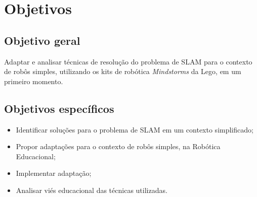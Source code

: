 	\section{Objetivos}

	\subsection{Objetivo geral} %
	\label{sub:objetivos_gerais}
	
		Adaptar e analisar técnicas de resolução do problema de SLAM para o contexto de robôs simples, utilizando os kits de robótica \textit{Mindstorms} da Lego, em um primeiro momento.


	\subsection{Objetivos específicos} %
	\label{sub:objetivos_específicos}
		 
	\begin{itemize}
		\item Identificar soluções para o problema de SLAM em um contexto simplificado;
		\item Propor adaptações para o contexto de robôs simples, na Robótica Educacional;
		\item Implementar adaptação;
		\item Analisar viés educacional das técnicas utilizadas.
	\end{itemize}
	

